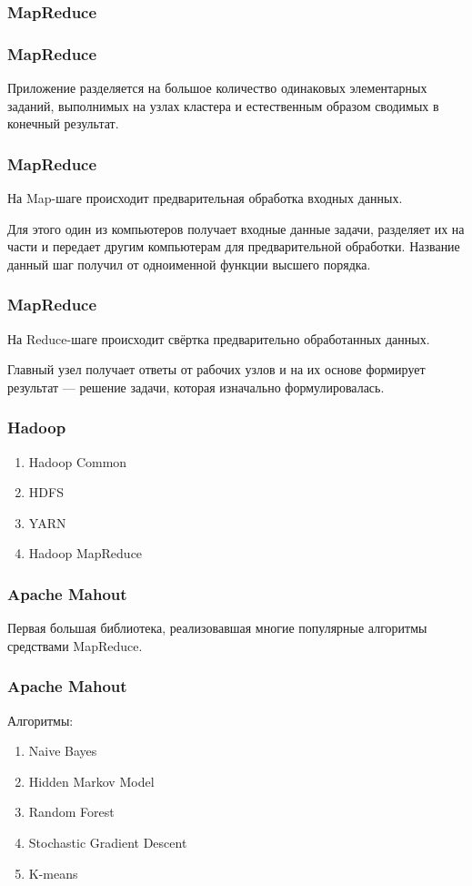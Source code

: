 \documentclass[12pt]{beamer}
\subtitle{Лекция 13. О разном.}
\begin{document}
	
\frame{\titlepage}

\begin{frame}\frametitle{MapReduce}

\end{frame}

\begin{frame}\frametitle{MapReduce}
Приложение разделяется на большое количество одинаковых элементарных заданий, выполнимых на узлах кластера и естественным образом сводимых в конечный результат. 
\end{frame}


\begin{frame}\frametitle{MapReduce}
На Map-шаге происходит предварительная обработка входных данных.

Для этого один из компьютеров получает входные данные задачи, разделяет их на части и передает другим компьютерам для предварительной обработки. Название данный шаг получил от одноименной функции высшего порядка.
\end{frame}

\begin{frame}\frametitle{MapReduce}

На Reduce-шаге происходит свёртка предварительно обработанных данных. 

Главный узел получает ответы от рабочих узлов и на их основе формирует результат — решение задачи, которая изначально формулировалась.

\end{frame}


\begin{frame}\frametitle{Hadoop}
\begin{enumerate}[--]
\item Hadoop Common
\item HDFS
\item YARN
\item Hadoop MapReduce
\end{enumerate}
\end{frame}

\begin{frame}\frametitle{Apache Mahout}
Первая большая библиотека, реализовавшая многие популярные алгоритмы средствами MapReduce.
\end{frame}

\begin{frame}\frametitle{Apache Mahout}
Алгоритмы:
\begin{enumerate}
\item Naive Bayes
\item Hidden Markov Model
\item Random Forest
\item Stochastic Gradient Descent
\item K-means
\end{enumerate}

\end{frame}
\end{document}

